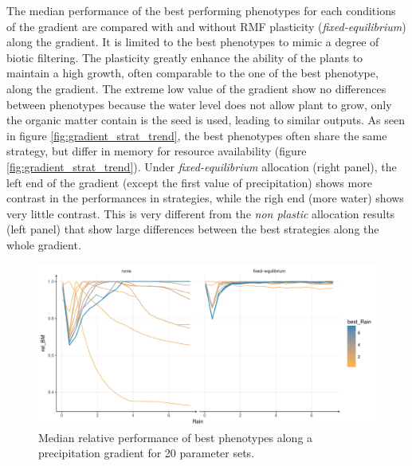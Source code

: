 The median performance of the best performing phenotypes for each conditions of the gradient are compared with and without RMF plasticity (\textit{fixed-equilibrium}) along the gradient. It is limited to the best phenotypes to mimic a degree of biotic filtering. The plasticity greatly enhance the ability of the plants to maintain a high growth, often comparable to the one of the best phenotype, along the gradient. The extreme low value of the gradient show no differences between phenotypes because the water level does not allow plant to grow, only the organic matter contain is the seed is used, leading to similar outputs. As seen in figure \ref{fig:gradient_strat_trend}, the best phenotypes often share the same strategy, but differ in memory for resource availability (figure \ref{fig:gradient_strat_trend}). Under \textit{fixed-equilibrium} allocation (right panel), the left end of the gradient (except the first value of precipitation) shows more contrast in the performances in strategies, while the righ end (more water) shows very little contrast. This is very different from the \textit{non plastic} allocation results (left panel) that show large differences between the best strategies along the whole gradient.  

\begin{figure}\label{fig:gradient_ranking}
\includegraphics[width = \textwidth]{./2_PP/Figures/Rain/optimum_shifting_median.pdf}
\caption{Median relative performance of best phenotypes along a precipitation gradient for 20 parameter sets.}
\end{figure}

%
%




